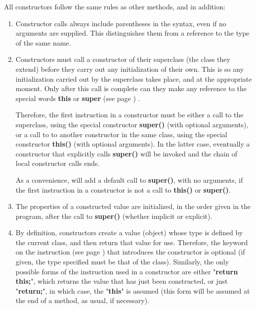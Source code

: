 All constructors follow the same rules as other methods, and in
addition:
\begin{enumerate}
\item Constructor calls always include parentheses in the syntax, even
if no arguments are supplied.  This distinguishes them from a reference
to the type of the same name.
\item Constructors must call a constructor of their superclass (the class
they extend) before they carry out any initialization of their own.
This is so any initialization carried out by the superclass takes
place, and at the appropriate moment.
Only after this call is complete can they make any reference to the
special words  \textbf{this} or \textbf{super} (see page \pageref{refspecial}) .
 
Therefore, the first instruction in a constructor must be either a call
to the superclass, using the special constructor \textbf{super()}
(with optional arguments), or a call to to another constructor in the
same class, using the special constructor \textbf{this()} (with
optional arguments).
In the latter case, eventually a constructor that explicitly
calls \textbf{super()} will be invoked and the chain of local
constructor calls ends.
 
As a convenience, \nr{} will add a default call to \textbf{super()},
with no arguments, if the first instruction in a constructor is not a
call to \textbf{this()} or \textbf{super()}.
\item 
The properties of a constructed value are initialized, in the order
given in the program, after the call to \textbf{super()} (whether
implicit or explicit).
\item 
By definition, constructors create a value (object) whose type is
defined by the current class, and then return that value for use.
Therefore, the  keyword on the
  instruction (see page \pageref{refmethod})  that introduces the
constructor is optional (if given, the type specified must be that of
the class).
Similarly, the only possible forms of the  instruction
used in a constructor are either "\textbf{return this;}", which
returns the value that has just been constructed, or just
"\textbf{return;}", in which case, the "\textbf{this}" is
assumed (this form will be assumed at the end of a method, as usual, if
necessary).
\end{enumerate}
 
